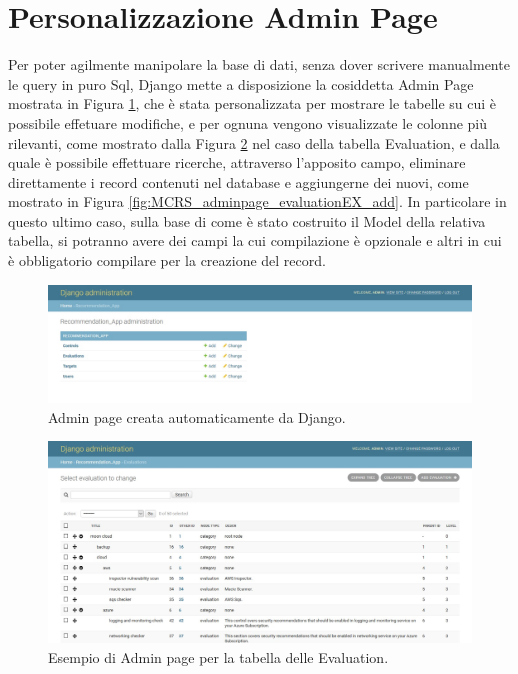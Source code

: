 \section*{Personalizzazione Admin Page}
Per poter agilmente manipolare la base di dati, senza dover scrivere manualmente le query in puro Sql, Django mette a disposizione 
la cosiddetta Admin Page mostrata in Figura \ref{fig:MCRS_adminpage}, che è stata personalizzata per mostrare le tabelle su cui è possibile 
effetuare modifiche, e per ognuna vengono visualizzate le colonne più rilevanti, come mostrato dalla 
Figura \ref{fig:MCRS_adminpage_evaluationEX} nel caso della tabella Evaluation, e dalla quale è possibile effettuare ricerche, attraverso 
l'apposito campo, eliminare direttamente i record contenuti nel database e aggiungerne dei nuovi, come mostrato in 
Figura \ref{fig:MCRS_adminpage_evaluationEX_add}.\hfill\break
In particolare in questo ultimo caso, sulla base di come è stato costruito il Model della relativa tabella, si potranno avere dei campi 
la cui compilazione è opzionale e altri in cui è obbligatorio compilare per la creazione del record.
%
\begin{figure}[ht!]
    \centering
    \includegraphics[scale=0.38]{images/MCRS_adminpage.jpg}
    \caption[Admin page creata automaticamente da Django]{Admin page creata automaticamente da Django.}
    \label{fig:MCRS_adminpage}
\end{figure}
%
\begin{figure}[ht!]
    \centering
    \includegraphics[scale=0.38]{images/MCRS_adminpage_evaluationEX.jpg}
    \caption[Admin page per la tabella delle Evaluation]{Esempio di Admin page per la tabella delle Evaluation.}
    \label{fig:MCRS_adminpage_evaluationEX}
\end{figure}
